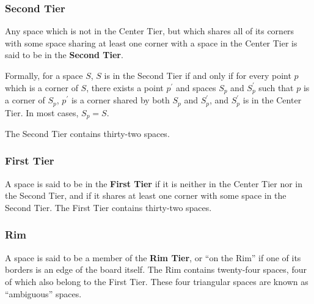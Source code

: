 \subsubsection{Second Tier}
Any space which is not in the Center Tier, but which shares
all of its corners with some space sharing at least one
corner with a space in the Center Tier is said to be
in the {\bf Second Tier}.

Formally, for a space $S$, $S$ is in the Second Tier
if and only if for every point $p$ which is a corner
of $S$, there exists a point $p^\prime$ and spaces
$S_p$ and $S_p^\prime$ such that $p$ is a corner
of $S_p$, $p^\prime$ is a corner shared by both
$S_p$ and $S_p^\prime$,
and $S_p^\prime$ is in the Center Tier.
In most cases, $S_p = S$.

The Second Tier contains thirty-two spaces.

\subsubsection{First Tier}
A space is said to be in the {\bf First Tier} if it is neither
in the Center Tier nor in the Second Tier, and if it shares at
least one corner with some space in the Second Tier.  The First Tier
contains thirty-two spaces.

\subsubsection{Rim}
A space is said to be a member of the {\bf Rim Tier}, or ``on the Rim''
if one of its borders is an edge of the board itself.
The Rim contains twenty-four spaces, four of which also belong
to the First Tier.  These four triangular spaces are known as
``ambiguous'' spaces.



